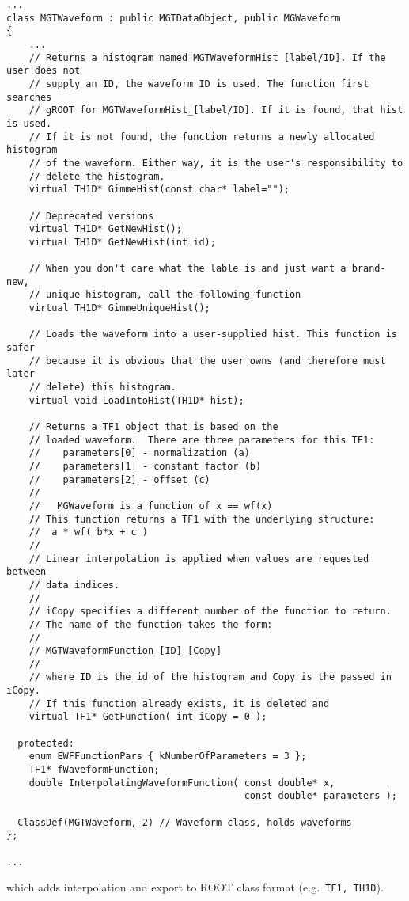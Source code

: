 			\begin{lstlisting}[label=lst:RootWaveformExamp]
...
class MGTWaveform : public MGTDataObject, public MGWaveform
{
    ...
    // Returns a histogram named MGTWaveformHist_[label/ID]. If the user does not
    // supply an ID, the waveform ID is used. The function first searches
    // gROOT for MGTWaveformHist_[label/ID]. If it is found, that hist is used.
    // If it is not found, the function returns a newly allocated histogram 
    // of the waveform. Either way, it is the user's responsibility to
    // delete the histogram.
    virtual TH1D* GimmeHist(const char* label=""); 

    // Deprecated versions
    virtual TH1D* GetNewHist();
    virtual TH1D* GetNewHist(int id); 

    // When you don't care what the lable is and just want a brand-new,
    // unique histogram, call the following function
    virtual TH1D* GimmeUniqueHist(); 

    // Loads the waveform into a user-supplied hist. This function is safer
    // because it is obvious that the user owns (and therefore must later
    // delete) this histogram.
    virtual void LoadIntoHist(TH1D* hist);

    // Returns a TF1 object that is based on the       
    // loaded waveform.  There are three parameters for this TF1:
    //    parameters[0] - normalization (a)
    //    parameters[1] - constant factor (b)
    //    parameters[2] - offset (c)
    //    
    //   MGWaveform is a function of x == wf(x)
    // This function returns a TF1 with the underlying structure:
    //  a * wf( b*x + c )
    //  
    // Linear interpolation is applied when values are requested between 
    // data indices.
    //
    // iCopy specifies a different number of the function to return.
    // The name of the function takes the form:
    //
    // MGTWaveformFunction_[ID]_[Copy] 
    //
    // where ID is the id of the histogram and Copy is the passed in iCopy.
    // If this function already exists, it is deleted and  
    virtual TF1* GetFunction( int iCopy = 0 );

  protected:
    enum EWFFunctionPars { kNumberOfParameters = 3 }; 
    TF1* fWaveformFunction;
    double InterpolatingWaveformFunction( const double* x, 
                                          const double* parameters ); 

  ClassDef(MGTWaveform, 2) // Waveform class, holds waveforms
};

...			\end{lstlisting}		
which adds interpolation and export to ROOT class format (e.g.~\lstinline!TF1, TH1D!).
